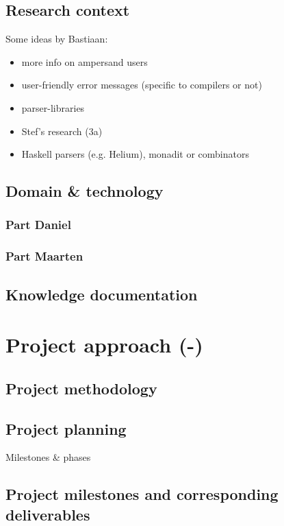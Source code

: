 \documentclass[a4paper,12pt,abstracton,titlepage]{scrartcl}
\begin{document}
\subsection{Research context}
Some ideas by Bastiaan:
\begin{itemize}
  \item more info on ampersand users
  \item user-friendly error messages (specific to compilers or not)
  \item parser-libraries
  \item Stef's research (3a)
  \item Haskell parsers (e.g. Helium), monadit or combinators
\end{itemize}

\subsection{Domain \& technology}
\subsubsection{Part Daniel}
\lipsum[1]

\subsubsection{Part Maarten}
\lipsum[1]

\subsection{Knowledge documentation}
\lipsum[1]

\section{Project approach (-)}
\label{sec:project-approach}
\subsection{Project methodology}
\lipsum[1]

\subsection{Project planning}
Milestones \& phases

\subsection{Project milestones and corresponding deliverables }
\lipsum[1]
\end{document}
